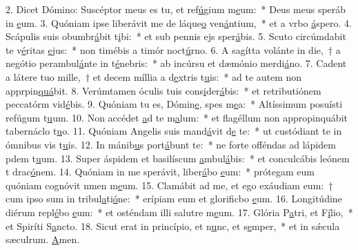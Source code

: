 2. Dicet Dómino: Suscéptor meus es tu, et ref\uline{ú}gium m\uline{e}um:~* Deus meus speráb in \uline{e}um.
3. Quóniam ipse liberávit me de láque\uline{o} ven\uline{á}ntium,~* et a vrbo \uline{á}spero.
4. Scápulis suis obumbr\uline{á}bit t\uline{i}bi:~* et sub pennis ejs sper\uline{á}bis.
5. Scuto circúmdabit te v\uline{é}ritas \uline{e}jus:~* non timébis a timór noct\uline{ú}rno.
6. A sagítta volánte in die,~† a negótio perambul\uline{á}nte in t\uline{é}nebris:~* ab incúrsu et dæmónio merdi\uline{á}no.
7. Cadent a látere tuo mille,~† et decem míllia a d\uline{e}xtris t\uline{u}is:~* ad te autem non apprpin\uline{quá}bit.
8. Verúmtamen óculis tuis cons\uline{i}der\uline{á}bis:~* et retributiónem peccatórm vid\uline{é}bis.
9. Quóniam tu es, Dómin\uline{e}, spes m\uline{e}a:~* Altíssimum posuísti refúgum t\uline{u}um.
10. Non accédet \uline{a}d te m\uline{a}lum:~* et flagéllum non appropinquábit tabernáclo t\uline{u}o.
11. Quóniam Angelis suis mand\uline{á}vit d\uline{e} te:~* ut custódiant te in ómnibus vis t\uline{u}is.
12. In mánib\uline{u}s port\uline{á}bunt te:~* ne forte offéndas ad lápidem pdem t\uline{u}um.
13. Super áspidem et basilíscum \uline{a}mbul\uline{á}bis:~* et conculcábis leónem t drac\uline{ó}nem.
14. Quóniam in me sperávit, liber\uline{á}bo \uline{e}um:~* prótegam eum quóniam cognóvit nmen m\uline{e}um.
15. Clamábit ad me, et ego exáudiam eum:~† cum ipso sum in tribul\uline{a}ti\uline{ó}ne:~* erípiam eum et glorificbo \uline{e}um.
16. Longitúdine diérum repl\uline{é}bo \uline{e}um:~* et osténdam illi salutre m\uline{e}um.
17. Glória P\uline{a}tri, et F\uline{í}lio,~* et Spiríti S\uline{a}ncto.
18. Sicut erat in princípio, et n\uline{u}nc, et s\uline{e}mper,~* et in sǽcula sæculrum. \uline{A}men.
